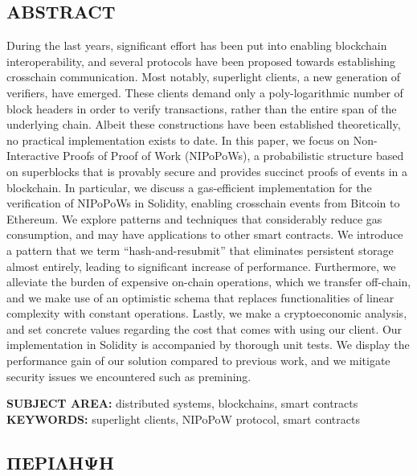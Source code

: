 \begin{center}
    \section*{ABSTRACT}
\end{center}

During the last years, significant effort has been put into enabling blockchain
interoperability, and several protocols have been proposed towards establishing
crosschain communication. Most notably, superlight clients, a new generation of
verifiers, have emerged. These clients demand only a poly-logarithmic number of
block headers in order to verify transactions, rather than the entire span of
the underlying chain. Albeit these constructions have been established
theoretically, no practical implementation exists to date. In this paper, we
focus on Non-Interactive Proofs of Proof of Work (NIPoPoWs), a probabilistic
structure based on superblocks that is provably secure and provides succinct
proofs of events in a blockchain. In particular, we discuss a gas-efficient
implementation for the verification of NIPoPoWs in Solidity, enabling
crosschain events from Bitcoin to Ethereum. We explore patterns and techniques
that considerably reduce gas consumption, and may have applications to other
smart contracts. We introduce a pattern that we term ``hash-and-resubmit'' that
eliminates persistent storage almost entirely, leading to significant increase
of performance. Furthermore, we alleviate the burden of expensive on-chain
operations, which we transfer off-chain, and we make use of an optimistic
schema that replaces functionalities of linear complexity with constant
operations. Lastly, we make a cryptoeconomic analysis, and set concrete values
regarding the cost that comes with using our client. Our implementation in
Solidity is accompanied by thorough unit tests. We display the performance gain
of our solution compared to previous work, and we mitigate security issues we
encountered such as premining.

\vspace{8.5cm}
\noindent
\textbf{SUBJECT AREA:} distributed systems, blockchains, smart contracts\\
\textbf{KEYWORDS:} superlight clients, NIPoPoW protocol, smart contracts

\newpage

\begin{center}
    \section*{ΠΕΡIΛΗΨΗ}
\end{center}

